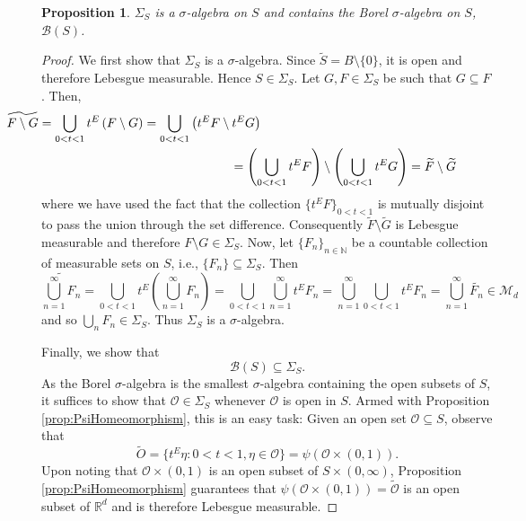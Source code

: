 \documentclass[11pt]{article}
\theoremstyle{theorem}
\newtheorem{proposition}[theorem]{Proposition}
\begin{document}
\begin{proposition}\label{prop:BorelContainment}
$\Sigma_S$ is a $\sigma$-algebra on $S$ and contains the Borel $\sigma$-algebra on $S$, $\mathcal{B}(S)$.
\end{proposition}

\begin{proof}
We first show that $\Sigma_S$ is a $\sigma$-algebra. Since $\widetilde S=B\setminus\{0\}$, it is open and therefore Lebesgue measurable. Hence $S\in \Sigma_S$. Let $G, F\in \Sigma_S$ be such that $G\subseteq F$. Then,
\begin{eqnarray*}
\lefteqn{\hspace{-2cm}\widetilde{F\setminus G}=\bigcup_{0<t<1}t^E\left(F\setminus G\right)=\bigcup_{0<t<1}\left(t^EF\setminus t^E G\right)}\\
&&\hspace{4cm}=\left(\bigcup_{0<t<1}t^E F\right)\setminus\left(\bigcup_{0<t<1}t^E G\right)=\widetilde F\setminus \widetilde G
\end{eqnarray*}
where we have used the fact that the collection $\{t^E F\}_{0<t<1}$ is mutually disjoint to pass the union through the set difference. Consequently $\widetilde F\setminus \tilde{G}$ is Lebesgue measurable and therefore $F\setminus G\in \Sigma_S$.  Now, let $\{F_n\}_{n\in\mathbb{N}}$ be a countable collection of measurable sets on $S$, i.e., $\{F_n\}\subseteq \Sigma_S$. Then
\begin{equation*}
    \widetilde{\bigcup_{n=1}^\infty F_n}= \bigcup_{0<t<1} t^E \left(\bigcup_{n=1}^\infty F_n\right)= \bigcup_{0 <t < 1}  \bigcup_{n=1}^\infty  t^E F_n =\bigcup_{n=1}^\infty \bigcup_{0 <t < 1}  t^E F_n =\bigcup_{n=1}^\infty \widetilde{F_n} \in \mathcal{M}_d
\end{equation*}
and so $\bigcup_n F_n\in \Sigma_S$. Thus $\Sigma_S$ is a $\sigma$-algebra. 

Finally, we show that
\begin{equation*}
\mathcal{B}(S)\subseteq\Sigma_S.
\end{equation*}
As the Borel $\sigma$-algebra is the smallest $\sigma$-algebra containing the open subsets of $S$, it suffices to show that $\mathcal{O}\in \Sigma_S$ whenever $\mathcal{O}$ is open in $S$. Armed with Proposition \ref{prop:PsiHomeomorphism}, this is an easy task: Given an open set $\mathcal{O}\subseteq S$, observe that
\begin{equation*}
\widetilde{O}=\{t^E\eta:0<t<1,\eta\in\mathcal{O}\}=\psi(\mathcal{O}\times (0,1)).
\end{equation*}
Upon noting that $\mathcal{O}\times (0,1)$ is an open subset of $S\times (0,\infty)$, Proposition \ref{prop:PsiHomeomorphism} guarantees that $\psi(\mathcal{O}\times (0,1))=\widetilde{\mathcal{O}}$ is an open subset of $\mathbb{R}^d$ and is therefore Lebesgue measurable. 
\end{proof}
\end{document}

